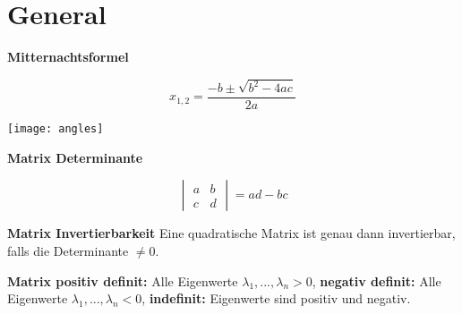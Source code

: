 \section{General}

\textbf{Mitternachtsformel}

\[
    x_{1, 2} = \frac{-b \pm \sqrt{b^2 - 4ac}}{2a}
\]

\texttt{[image: angles]}

\textbf{Matrix Determinante}

\[
    \begin{vmatrix}
        a & b\\
        c & d
    \end{vmatrix} = ad-bc
\]

\textbf{Matrix Invertierbarkeit} Eine quadratische Matrix ist genau dann invertierbar, falls die Determinante $\neq 0$.

\textbf{Matrix positiv definit:} Alle Eigenwerte $\lambda_1, ..., \lambda_n > 0$, \textbf{negativ definit:} Alle Eigenwerte $\lambda_1, ..., \lambda_n < 0$, \textbf{indefinit:} Eigenwerte sind positiv und negativ.\\